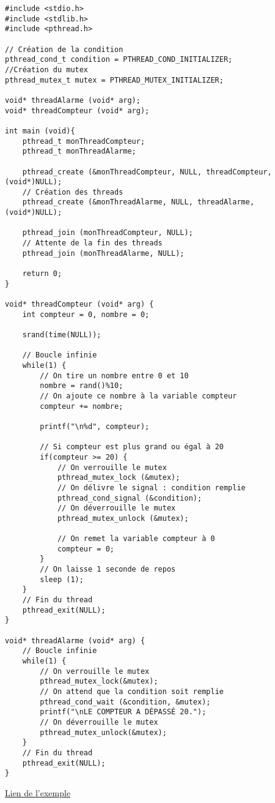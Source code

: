 \documentclass[a4paper]{article}
\begin{document}
\begin{lstlisting}
#include <stdio.h>
#include <stdlib.h>
#include <pthread.h>

// Création de la condition
pthread_cond_t condition = PTHREAD_COND_INITIALIZER;
//Création du mutex
pthread_mutex_t mutex = PTHREAD_MUTEX_INITIALIZER;

void* threadAlarme (void* arg);
void* threadCompteur (void* arg);

int main (void){
	pthread_t monThreadCompteur;
	pthread_t monThreadAlarme;

	pthread_create (&monThreadCompteur, NULL, threadCompteur, (void*)NULL);
    // Création des threads
	pthread_create (&monThreadAlarme, NULL, threadAlarme, (void*)NULL);

	pthread_join (monThreadCompteur, NULL);
    // Attente de la fin des threads
	pthread_join (monThreadAlarme, NULL);

	return 0;
}

void* threadCompteur (void* arg) {
	int compteur = 0, nombre = 0;

	srand(time(NULL));

    // Boucle infinie
	while(1) {
        // On tire un nombre entre 0 et 10
		nombre = rand()%10;
        // On ajoute ce nombre à la variable compteur
		compteur += nombre;

		printf("\n%d", compteur);

        // Si compteur est plus grand ou égal à 20
		if(compteur >= 20) {
            // On verrouille le mutex
			pthread_mutex_lock (&mutex);
            // On délivre le signal : condition remplie
			pthread_cond_signal (&condition);
            // On déverrouille le mutex
			pthread_mutex_unlock (&mutex);

            // On remet la variable compteur à 0
			compteur = 0;
		}
        // On laisse 1 seconde de repos
		sleep (1);
	}
    // Fin du thread
	pthread_exit(NULL);
}

void* threadAlarme (void* arg) {
    // Boucle infinie
	while(1) {
        // On verrouille le mutex
		pthread_mutex_lock(&mutex);
        // On attend que la condition soit remplie
		pthread_cond_wait (&condition, &mutex);
		printf("\nLE COMPTEUR A DÉPASSÉ 20.");
        // On déverrouille le mutex
		pthread_mutex_unlock(&mutex);
	}
    // Fin du thread
	pthread_exit(NULL);
}
\end{lstlisting}
\href{https://openclassrooms.com/courses/la-programmation-systeme-en-c-sous-unix/les-threads-3#/id/r-1515355}{Lien de l'exemple}
\end{document}

